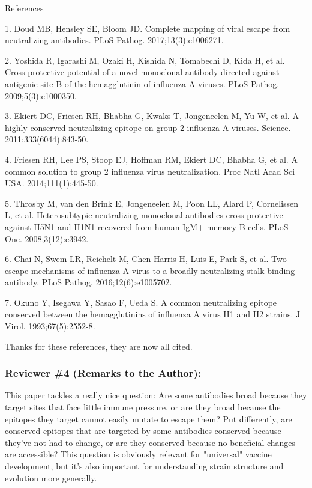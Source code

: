 \documentclass[11pt, oneside]{article}   	%
\begin{document}
References

1.  Doud MB, Hensley SE, Bloom JD. Complete mapping of viral escape from neutralizing antibodies. PLoS Pathog. 2017;13(3):e1006271.

2.  Yoshida R, Igarashi M, Ozaki H, Kishida N, Tomabechi D, Kida H, et al. Cross-protective potential of a novel monoclonal antibody directed against antigenic site B of the hemagglutinin of influenza A viruses. PLoS Pathog. 2009;5(3):e1000350.

3.  Ekiert DC, Friesen RH, Bhabha G, Kwaks T, Jongeneelen M, Yu W, et al. A highly conserved neutralizing epitope on group 2 influenza A viruses. Science. 2011;333(6044):843-50.

4.  Friesen RH, Lee PS, Stoop EJ, Hoffman RM, Ekiert DC, Bhabha G, et al. A common solution to group 2 influenza virus neutralization. Proc Natl Acad Sci USA. 2014;111(1):445-50.

5.  Throsby M, van den Brink E, Jongeneelen M, Poon LL, Alard P, Cornelissen L, et al. Heterosubtypic neutralizing monoclonal antibodies cross-protective against H5N1 and H1N1 recovered from human IgM+ memory B cells. PLoS One. 2008;3(12):e3942.

6.  Chai N, Swem LR, Reichelt M, Chen-Harris H, Luis E, Park S, et al. Two escape mechanisms of influenza A virus to a broadly neutralizing stalk-binding antibody. PLoS Pathog. 2016;12(6):e1005702.

7.  Okuno Y, Isegawa Y, Sasao F, Ueda S. A common neutralizing epitope conserved between the hemagglutinins of influenza A virus H1 and H2 strains. J Virol. 1993;67(5):2552-8.

{\color{black}
Thanks for these references, they are now all cited.
}


\subsubsection*{Reviewer \#4 (Remarks to the Author):}

This paper tackles a really nice question: Are some antibodies broad because they target sites that face little immune pressure, or are they broad because the epitopes they target cannot easily mutate to escape them? Put differently, are conserved epitopes that are targeted by some antibodies conserved because they've not had to change, or are they conserved because no beneficial changes are accessible? This question is obviously relevant for "universal" vaccine development, but it's also important for understanding strain structure and evolution more generally.
\end{document}
